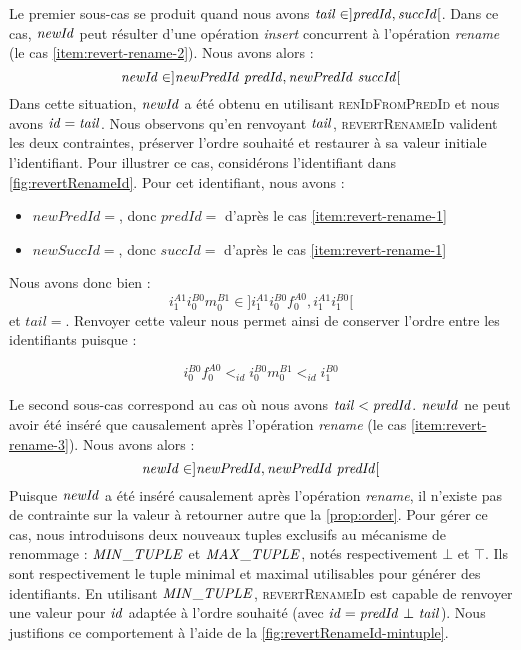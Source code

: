Le premier sous-cas se produit quand nous avons $\mathit{tail} \in ]\mathit{predId}, \mathit{succId}[$.
Dans ce cas, $\mathit{newId}$ peut résulter d'une opération \emph{insert} concurrent à l'opération \emph{rename} (\ie le cas \ref{item:revert-rename-2}).
Nous avons alors :
\[\mathit{newId} \in ]\mathit{newPredId~predId}, \mathit{newPredId~succId}[\]
Dans cette situation, $\mathit{newId}$ a été obtenu en utilisant \textsc{renIdFromPredId} et nous avons $\mathit{id} = \mathit{tail}$.
Nous observons qu'en renvoyant $\mathit{tail}$, \textsc{revertRenameId} valident les deux contraintes, \ie préserver l'ordre souhaité et restaurer à sa valeur initiale l'identifiant.
Pour illustrer ce cas, considérons l'identifiant  dans \autoref{fig:revertRenameId}.
Pour cet identifiant, nous avons :
\begin{itemize}
  \item $newPredId = $, donc $predId = $ d'après le cas \ref{item:revert-rename-1}
  \item $newSuccId = $, donc $succId = $ d'après le cas \ref{item:revert-rename-1}
\end{itemize}
Nous avons donc bien :
\[i^{A1}_{1}i^{B0}_{0}m^{B1}_{0} \in ]i^{A1}_{1}i^{B0}_{0}f^{A0}_{0}, i^{A1}_{1}i^{B0}_{1}[\]
et $tail = $.
Renvoyer cette valeur nous permet ainsi de conserver l'ordre entre les identifiants puisque :

\[i^{B0}_{0}f^{A0}_{0} <_{id} i^{B0}_{0}m^{B1}_{0} <_{id} i^{B0}_{1}\]

Le second sous-cas correspond au cas où nous avons $\mathit{tail} < \mathit{predId}$.
$\mathit{newId}$ ne peut avoir été inséré que causalement après l'opération \emph{rename} (\ie le cas \ref{item:revert-rename-3}).
Nous avons alors :
\[\mathit{newId} \in ]\mathit{newPredId}, \mathit{newPredId~predId}[\]
Puisque $\mathit{newId}$ a été inséré causalement après l'opération \emph{rename}, il n'existe pas de contrainte sur la valeur à retourner autre que la \autoref{prop:order}.
Pour gérer ce cas, nous introduisons deux nouveaux tuples exclusifs au mécanisme de renommage : $\mathit{MIN\_TUPLE}$ et $\mathit{MAX\_TUPLE}$, notés respectivement $\bot$ et $\top$.
Ils sont respectivement le tuple minimal et maximal utilisables pour générer des identifiants.
En utilisant $\mathit{MIN\_TUPLE}$, \textsc{revertRenameId} est capable de renvoyer une valeur pour $\mathit{id}$ adaptée à l'ordre souhaité (avec $\mathit{id} = \mathit{predId~\bot~tail}$).
Nous justifions ce comportement à l'aide de la \autoref{fig:revertRenameId-mintuple}.

